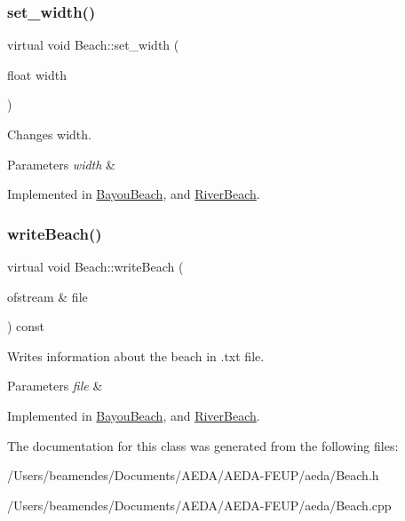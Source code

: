 \subsubsection{\texorpdfstring{set\+\_\+width()}{set\_width()}}
{\footnotesize\ttfamily virtual void Beach\+::set\+\_\+width (\begin{DoxyParamCaption}\item[{float}]{width }\end{DoxyParamCaption})\hspace{0.3cm}{\ttfamily [pure virtual]}}



Changes width. 


\begin{DoxyParams}{Parameters}
{\em width} & \\
\hline
\end{DoxyParams}


Implemented in \hyperlink{class_bayou_beach_a4bb316d56e931c219554b63a9ae68136}{Bayou\+Beach}, and \hyperlink{class_river_beach_a53697d96e65d8841e5979d3f5d79c9e3}{River\+Beach}.

\mbox{\label{class_beach_a2ba3bf80382fa1b5e00befe0c4ccde88}} 
\subsubsection{\texorpdfstring{write\+Beach()}{writeBeach()}}
{\footnotesize\ttfamily virtual void Beach\+::write\+Beach (\begin{DoxyParamCaption}\item[{ofstream \&}]{file }\end{DoxyParamCaption}) const\hspace{0.3cm}{\ttfamily [pure virtual]}}



Writes information about the beach in .txt file. 


\begin{DoxyParams}{Parameters}
{\em file} & \\
\hline
\end{DoxyParams}


Implemented in \hyperlink{class_bayou_beach_a16b3abbe3c2ebb1558d565f63178206a}{Bayou\+Beach}, and \hyperlink{class_river_beach_acdbf29ab6540a2b0a5fd18cbea14375b}{River\+Beach}.



The documentation for this class was generated from the following files\+:\begin{DoxyCompactItemize}
\item 
/\+Users/beamendes/\+Documents/\+A\+E\+D\+A/\+A\+E\+D\+A-\/\+F\+E\+U\+P/aeda/Beach.\+h\item 
/\+Users/beamendes/\+Documents/\+A\+E\+D\+A/\+A\+E\+D\+A-\/\+F\+E\+U\+P/aeda/Beach.\+cpp\end{DoxyCompactItemize}
